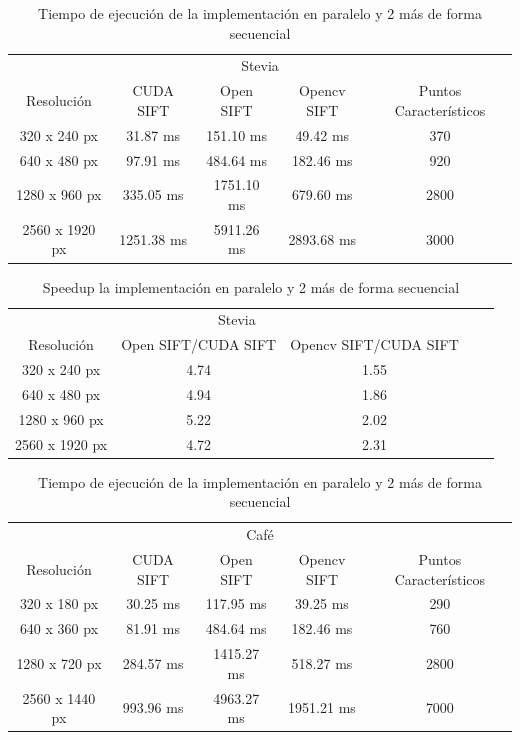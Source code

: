 \begin{table}[phtb]
\centering
\begin{tabular}{|c|c|c|c|c|}
\hline
\multicolumn{5}{|c|}{Stevia} \\
\cline{1-5}
Resolución & CUDA SIFT & Open SIFT & Opencv SIFT & Puntos Característicos\\
\hline \hline
 320 x 240 px  & 31.87 ms   &   151.10 ms  &  49.42 ms   & 370\\ \cline{1-5}
 640 x 480 px  & 97.91 ms   &   484.64 ms  &  182.46 ms  & 920\\ \cline{1-5}
1280 x 960 px  & 335.05 ms  &  1751.10 ms  &  679.60 ms  & 2800\\ \cline{1-5}
2560 x 1920 px & 1251.38 ms &  5911.26 ms  &  2893.68 ms & 3000\\ \cline{1-5}
\end{tabular}
\caption{Tiempo de ejecución de la implementación en paralelo y 2 más de forma secuencial}
\label{tabla:final}
\end{table}
\begin{table}[phtb]
\centering
\begin{tabular}{|c|c|c|c|c|}
\hline
\multicolumn{3}{|c|}{Stevia} \\
\cline{1-3}
Resolución & Open SIFT/CUDA SIFT & Opencv SIFT/CUDA SIFT \\
\hline \hline
 320 x 240 px  &  4.74  &  1.55   \\ \cline{1-3}
 640 x 480 px  &  4.94  &  1.86  \\ \cline{1-3}
1280 x 960 px  &  5.22  &  2.02  \\ \cline{1-3}
2560 x 1920 px &  4.72  &  2.31 \\ \cline{1-3}
\end{tabular}
\caption{Speedup la implementación en paralelo y 2 más de forma secuencial}
\label{tabla:final}
\end{table}

\begin{table}[phtb]
\centering
\begin{tabular}{|c|c|c|c|c|}
\hline
\multicolumn{5}{|c|}{Café} \\
\cline{1-5}
Resolución & CUDA SIFT & Open SIFT & Opencv SIFT & Puntos Característicos\\
\hline \hline
 320 x 180 px  & 30.25 ms  &  117.95 ms  & 39.25 ms   & 290\\ \cline{1-5}
 640 x 360 px  & 81.91 ms  &  484.64 ms  & 182.46 ms  & 760\\ \cline{1-5}
1280 x 720 px  & 284.57 ms &  1415.27 ms & 518.27 ms  & 2800\\ \cline{1-5}
2560 x 1440 px & 993.96 ms &  4963.27 ms & 1951.21 ms & 7000\\ \cline{1-5}
\end{tabular}
\caption{Tiempo de ejecución de la implementación en paralelo y 2 más de forma secuencial}
\label{tabla:final}
\end{table}

